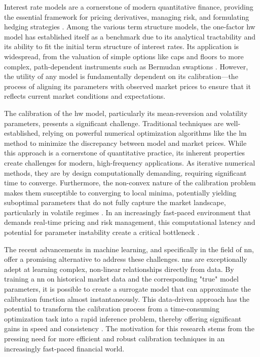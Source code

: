 Interest rate models are a cornerstone of modern quantitative finance, providing the essential framework for pricing derivatives, managing risk, and formulating hedging strategies \parencite{moysiadis2019calibrating}. Among the various term structure models, the one-factor \ac{hw} model has established itself as a benchmark due to its analytical tractability and its ability to fit the initial term structure of interest rates. Its application is widespread, from the valuation of simple options like caps and floors to more complex, path-dependent instruments such as Bermudan swaptions \parencite[p.~72]{brigo2006interest}. However, the utility of any model is fundamentally dependent on its calibration—the process of aligning its parameters with observed market prices to ensure that it reflects current market conditions and expectations.

The calibration of the \ac{hw} model, particularly its mean-reversion and volatility parameters, presents a significant challenge. Traditional techniques are well-established, relying on powerful numerical optimization algorithms like the \ac{lm} method to minimize the discrepancy between model and market prices. While this approach is a cornerstone of quantitative practice, its inherent properties create challenges for modern, high-frequency applications. As iterative numerical methods, they are by design computationally demanding, requiring significant time to converge. Furthermore, the non-convex nature of the calibration problem makes them susceptible to converging to local minima, potentially yielding suboptimal parameters that do not fully capture the market landscape, particularly in volatile regimes \parencite{vollrath2009calibration}. In an increasingly fast-paced environment that demands real-time pricing and risk management, this computational latency and potential for parameter instability create a critical bottleneck \parencite{lui2019nnfinancialmodelcalibration}.

The recent advancements in machine learning, and specifically in the field of \ac{nn}, offer a promising alternative to address these challenges. \ac{nn}s are exceptionally adept at learning complex, non-linear relationships directly from data. By training a \ac{nn} on historical market data and the corresponding "true" model parameters, it is possible to create a surrogate model that can approximate the calibration function almost instantaneously. This data-driven approach has the potential to transform the calibration process from a time-consuming optimization task into a rapid inference problem, thereby offering significant gains in speed and consistency \parencite{hernandez2016model}. The motivation for this research stems from the pressing need for more efficient and robust calibration techniques in an increasingly fast-paced financial world.

